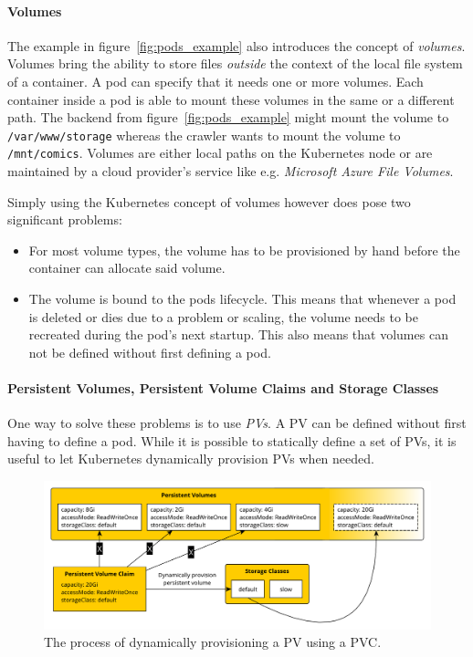 \paragraph{Volumes}%
\label{par:Volumes}

The example in figure~\ref{fig:pods_example} also introduces the concept of
\textit{volumes}. Volumes bring the ability to store files \textit{outside} the
context of the local file system of a container. A pod can specify that it
needs one or more volumes. Each container inside a pod is able to mount these
volumes in the same or a different path. The backend from
figure~\ref{fig:pods_example} might mount the volume to
\texttt{/var/www/storage} whereas the crawler wants to mount the volume to
\texttt{/mnt/comics}. Volumes are either local paths on the Kubernetes node or
are maintained by a cloud provider's service like e.g. \textit{Microsoft Azure
File Volumes}.

Simply using the Kubernetes concept of volumes however does pose two significant problems:
\begin{itemize}
  \item For most volume types, the volume has to be provisioned by hand before
    the container can allocate said volume.
  \item The volume is bound to the pods lifecycle. This means that whenever a
    pod is deleted or dies due to a problem or scaling, the volume needs
    to be recreated during the pod's next startup. This also means that volumes
    can not be defined without first defining a pod.
\end{itemize}

\paragraph{Persistent Volumes, Persistent Volume Claims and Storage Classes}%
\label{par:Persistent_Volume_Claims_and_Storage_Classes}
One way to solve these problems is to use \textit{\acfp{PV}}. A \ac{PV} can be
defined without first having to define a pod. While it is possible to
statically define a set of \acp{PV}, it is useful to let Kubernetes dynamically
provision \acp{PV} when needed.

\begin{figure}[H]
\begin{center}
  \includegraphics[scale=0.5]{images/figures/pvs.pdf}
\end{center}
\caption{The process of dynamically provisioning a \acf{PV} using a \acf{PVC}.}%
\label{fig:dynamic_pvs}
\end{figure}

